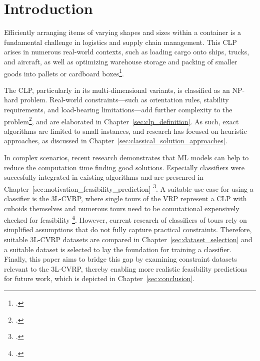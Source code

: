 \chapter{Introduction}
\label{sec:introduction}
Efficiently arranging items of varying shapes and sizes within a container is a fundamental challenge
in logistics and supply chain management. This \gls{CLP} arises in numerous real-world contexts,
such as loading cargo onto ships, trucks, and aircraft, as well as optimizing warehouse storage and
packing of smaller goods into pallets or cardboard boxes\footcite[cf.][p.1]{bortfeldt_constraints_2013}.

\parbreak

The \gls{CLP}, particularly in its multi-dimensional variants, is classified as an NP-hard problem.
Real-world constraints—such as orientation rules, stability requirements, and load-bearing
limitations—add further complexity to the problem\footcite[cf.][p.377-378]{bischoff_issues_1995},
and are elaborated in Chapter~\ref{sec:clp_definition}. As such, exact algorithms are limited to
small instances, and research has focused on heuristic approaches,
as discussed in Chapter~\ref{sec:classical_solution_approaches}.

\parbreak

In complex scenarios, recent research demonstrates that \gls{ML} models can help to reduce the computation
time finding good solutions. Especially classifiers were succesfully integrated in existing algorithms
and are presenred in Chapter~\ref{sec:motivation_feasibility_prediction} \footcite[cf.][]{zhang_learning-based_2022}.
A suitable use case for using a classifier is the \gls{3L-CVRP}, where single tours of the \gls{VRP}
represent a \gls{CLP} with cuboids themselves and numerous tours need to be comutational expensively checked for feasibility
\footcite[cf.][p. 1]{tamke_branch-and-cut_2024}. However, current research of classifiers of tours
rely on simplified assumptions that do not fully capture practical constraints. Therefore, suitable \gls{3L-CVRP}
datasets are compared in Chapter~\ref{sec:dataset_selection} and a suitable dataset is selected to
lay the foundation for training a classifier. Finally, this paper aims to bridge this gap by examining constraint
datasets relevant to the \gls{3L-CVRP}, thereby enabling more realistic feasibility predictions for
future work, which is depicted in Chapter~\ref{sec:conclusion}.


